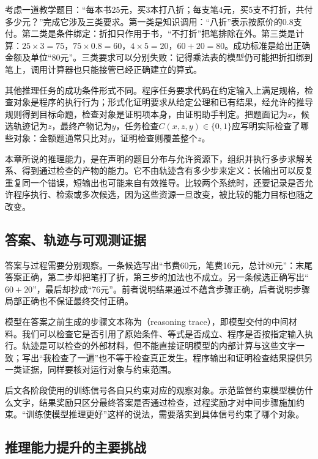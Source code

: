 考虑一道教学题目：“每本书25元，买3本打八折；每支笔4元，买5支不打折，共付多少元？”完成它涉及三类要求。第一类是知识调用：“八折”表示按原价的$0.8$支付。第二类是条件绑定：折扣只作用于书，“不打折”把笔排除在外。第三类是计算：$25\times3=75$，$75\times0.8=60$，$4\times5=20$，$60+20=80$。成功标准是给出正确金额及单位“80元”。三类要求可以分别失败：记得乘法表的模型仍可能把折扣绑到笔上，调用计算器也只能接管已经正确建立的算式。

其他推理任务的成功条件形式不同。程序任务要求代码在约定输入上满足规格，检查对象是程序的执行行为；形式化证明要求从给定公理和已有结果，经允许的推导规则得到目标命题，检查对象是证明项本身，由证明助手判定。把题面记为$x$，候选轨迹记为$z$，最终产物记为$y$，任务检查$C(x,z,y)\in\{0,1\}$应写明实际检查了哪些对象：金额题通常只比对$y$，证明检查则覆盖整个$z$。

本章所说的推理能力，是在声明的题目分布与允许资源下，组织并执行多步求解关系、得到通过检查的产物的能力。它不由轨迹含有多少步来定义：长输出可以反复重复同一个错误，短输出也可能来自有效推导。比较两个系统时，还要记录是否允许程序执行、检索或多次候选，因为这些资源一旦改变，被比较的能力目标也随之改变。

\subsection{答案、轨迹与可观测证据}
\label{sec:nlp-reasoning-evidence}

答案与过程需要分别观察。一条候选写出“书费60元，笔费16元，总计80元”：末尾答案正确，第二步却把笔打了折，第三步的加法也不成立。另一条候选正确写出“$60+20$”，最后却抄成“76元”。前者说明结果通过不蕴含步骤正确，后者说明步骤局部正确也不保证最终交付正确。

模型在答案之前生成的步骤文本称为（reasoning trace），即模型交付的中间材料。我们可以检查它是否引用了原始条件、等式是否成立、程序是否按指定输入执行。轨迹是可以检查的外部材料，但不能直接证明模型的内部计算与这些文字一致；写出“我检查了一遍”也不等于检查真正发生。程序输出和证明检查结果提供另一类证据，同样要核对运行对象与约束范围。

后文各阶段使用的训练信号各自只约束对应的观察对象。示范监督约束模型模仿什么文字，结果奖励只区分最终答案是否通过检查，过程奖励才对中间步骤施加约束。“训练使模型推理更好”这样的说法，需要落实到具体信号约束了哪个对象。

\subsection{推理能力提升的主要挑战}
\label{sec:nlp-reasoning-challenges}

